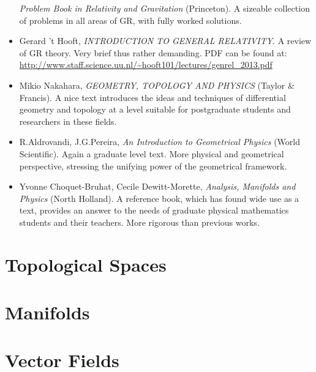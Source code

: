 \documentclass[a4paper,11pt]{article}
\begin{document}
\begin{itemize}
  \textit{Problem Book in Relativity and Gravitation} (Princeton). A
  sizeable collection of problems in all areas of GR, with fully
  worked solutions.
\item Gerard 't Hooft, \textit{INTRODUCTION TO GENERAL RELATIVITY}. A
  review of GR theory. Very brief thus rather demanding. PDF can be
  found at:
  \url{http://www.staff.science.uu.nl/~hooft101/lectures/genrel_2013.pdf}
\item Mikio Nakahara, \textit{GEOMETRY, TOPOLOGY AND PHYSICS} (Taylor
  & Francis). A nice text introduces the ideas and techniques of
  differential geometry and topology at a level suitable for
  postgraduate students and researchers in these fields.
\item R.Aldrovandi, J.G.Pereira, \textit{An Introduction to
    Geometrical Physics} (World Scientific). Again a graduate level
  text. More physical and geometrical perspective, stressing the
  unifying power of the geometrical framework.
\item Yvonne Choquet-Bruhat, Cecile Dewitt-Morette, \textit{Analysis,
    Manifolds and Physics} (North Holland). A reference book, which
  has found wide use as a text, provides an answer to the needs of
  graduate physical mathematics students and their teachers. More
  rigorous than previous works.
\end{itemize}

\clearpage

\section{Topological Spaces}
\label{s:topo}

\section{Manifolds}
\label{s:mani}

\section{Vector Fields}
\label{s:vefi}


\end{document}
